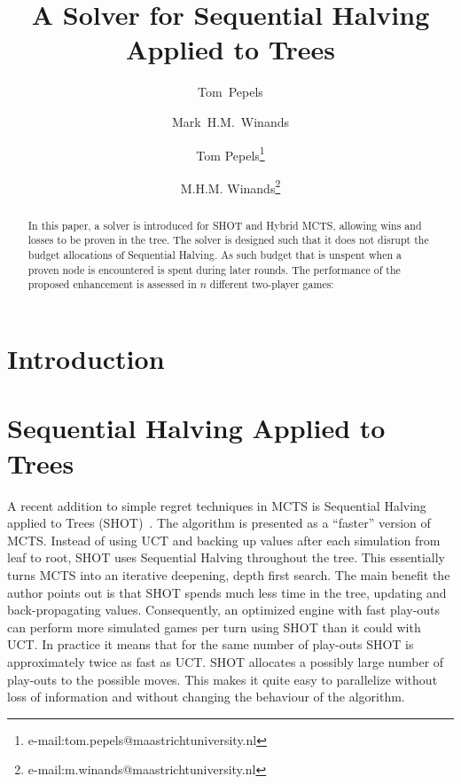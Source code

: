 \documentclass{icga}
\title{A Solver for Sequential Halving Applied to Trees}
\author{Tom~Pepels \and Mark~H.M.~Winands}
\author{Tom Pepels\thanks{e-mail:tom.pepels@maastrichtuniversity.nl} \and M.H.M. Winands\thanks{e-mail:m.winands@maastrichtuniversity.nl}}
\affiliation{Maastricht University, Maastricht, The Netherlands} \issue{?, ?}
\begin{document}
\maketitle
\begin{abstract}
In this paper, a solver is introduced for SHOT and Hybrid MCTS, allowing wins and losses to be proven in the tree. The solver is designed such that it does not disrupt the budget allocations of Sequential Halving. As such budget that is unspent when a proven node is encountered is spent during later rounds. The performance of the proposed enhancement is assessed in $n$ different two-player games: 
\end{abstract}

\section{Introduction}

\section{Sequential Halving Applied to Trees}
\label{sec:SHOT}

A recent addition to simple regret techniques in MCTS is Sequential Halving applied to Trees (SHOT)~\cite{Cazenave14SHOT}. The algorithm is presented as a ``faster'' version of MCTS. Instead of using UCT and backing up values after each simulation from leaf to root, SHOT uses Sequential Halving throughout the tree. This essentially turns MCTS into an iterative deepening, depth first search. The main benefit the author points out is that SHOT spends much less time in the tree, updating and back-propagating values. Consequently, an optimized engine with fast play-outs can perform more simulated games per turn using SHOT than it could with UCT. In practice it means that for the same number of play-outs SHOT is approximately twice as fast as UCT. SHOT allocates a
possibly large number of play-outs to the possible moves. This makes it quite easy to parallelize without loss of information and without changing the behaviour of the algorithm.
\end{document}

